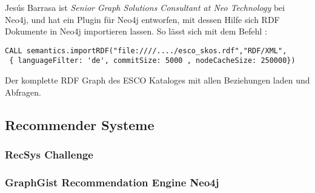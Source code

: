 Jesús Barrasa ist  \textit{Senior Graph Solutions Consultant at Neo Technology} bei Neo4j, und hat ein Plugin für Neo4j entworfen, mit dessen Hilfe sich RDF Dokumente in Neo4j importieren lassen. So lässt sich mit dem Befehl :
\vspace{1em}

\begin{lstlisting}[frame=htrbl, caption={Das Listing zeigt einen Funktionsaufruf über die Neo4j}, label={lst:result2}]
CALL semantics.importRDF("file:////..../esco_skos.rdf","RDF/XML",
 { languageFilter: 'de', commitSize: 5000 , nodeCacheSize: 250000})	
\end{lstlisting}

Der komplette RDF Graph des ESCO Kataloges mit allen Beziehungen laden und Abfragen.


\subsection{Recommender Systeme}
\subsubsection{RecSys Challenge}
\subsubsection{GraphGist Recommendation Engine Neo4j}




